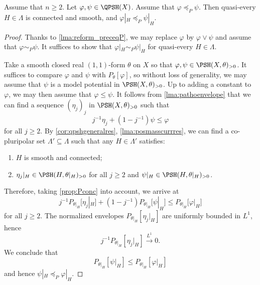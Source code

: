 \begin{proposition}\label{prop:varphiP_rest_gen}
    Assume that $n\geq 2$. Let $\varphi,\psi\in \QPSH(X)$. Assume that $\varphi\preceq_P \psi$. Then quasi-every $H\in \Lambda$ is connected and smooth, and $\varphi|_H\preceq_P \psi|_H$.
\end{proposition}
\begin{proof}
    Thanks to \cref{lma:reform_preceqP}, we may replace $\varphi$ by $\varphi\lor \psi$ and assume that $\varphi\sim_P \psi$.
    It suffices to show that $\varphi|_H\sim_P \psi|_H$ for quasi-every $H\in \Lambda$.

    Take a smooth closed real $(1,1)$-form $\theta$ on $X$ so that $\varphi,\psi\in \PSH(X,\theta)_{>0}$. It suffices to compare $\varphi$ and $\psi$ with $P_{\theta}[\varphi]$, so without loss of generality, we may assume that $\psi$ is a model potential in $\PSH(X,\theta)_{>0}$. Up to adding a constant to $\varphi$, we may then assume that $\varphi\leq \psi$. It follows from \cref{lma:pathoenvelope} that we can find a sequence $(\eta_j)_j$ in $\PSH(X,\theta)_{>0}$ such that
    \[
    j^{-1}\eta_j+\left(1-j^{-1}\right)\psi\leq \varphi
    \]
    for all $j\geq 2$. By \cref{cor:qpshgeneralres}, \cref{lma:posmasscurrres}, we can find a co-pluripolar set $\Lambda'\subseteq \Lambda$ such that any $H\in \Lambda'$ satisfies:
    \begin{enumerate}
        \item\label{itm:chapter-trace:L1015:1} $H$ is smooth and connected;
        \item\label{itm:chapter-trace:L1015:2} $\eta_j|_H\in \PSH(H,\theta|_H)_{>0}$ for all $j\geq 2$ and $\psi|_H\in \PSH(H,\theta|_H)_{>0}$.
    \end{enumerate}
    Therefore, taking \cref{prop:Pconc} into account, we arrive at
    \[
    j^{-1} P_{\theta|_H}\bigl[\eta_j|_H\bigr]+\left(1-j^{-1}\right)P_{\theta|_H}\bigl[\psi|_H\bigr]\leq P_{\theta|_H}\bigl[\varphi|_H\bigr]
    \]
    for all $j\geq 2$. The normalized envelopes $P_{\theta|_H}[\eta_j|_H]$ are uniformly bounded in $L^1$, hence
    \[
        j^{-1}P_{\theta|_H}[\eta_j|_H]\xrightarrow{L^1} 0.
    \]
    We conclude that
    \[
    P_{\theta|_H}[\psi|_H]\leq P_{\theta|_H}[\varphi|_H]
    \]
    and hence $\psi|_H\preceq_P \varphi|_H$.
\end{proof}

